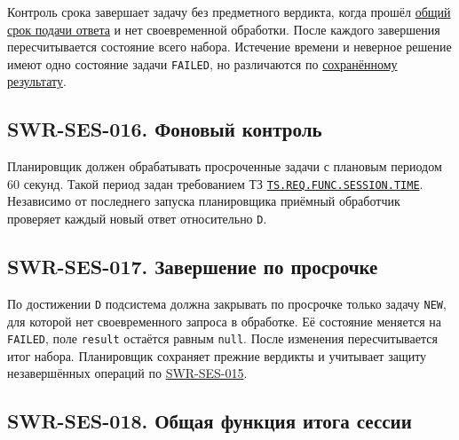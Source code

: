 \documentclass[12pt,a4paper]{article}
\begin{document}
\hypertarget{4-контроль-срока-и-итог}{}

Контроль срока завершает задачу без предметного вердикта, когда прошёл {\hyperlink{время-решения-и-время-обработки}{общий срок подачи ответа}} и нет своевременной обработки. После каждого завершения пересчитывается состояние всего набора. Истечение времени и неверное решение имеют одно состояние задачи \texttt{FAILED}, но различаются по {\hyperlink{чтение-после-потери-ответа}{сохранённому результату}}.

\subsection{SWR-SES-016. Фоновый контроль}\label{swr-ses-016-ux444ux43eux43dux43eux432ux44bux439-ux43aux43eux43dux442ux440ux43eux43bux44c}

\hypertarget{swr-ses-016-фоновый-контроль}{}

\hypertarget{swr-ses-016}{}

Планировщик должен обрабатывать просроченные задачи с плановым периодом 60 секунд. Такой период задан требованием ТЗ {\href{../02\_Техническое\_задание/DOC-02\_Техническое\_задание.pdf\#ts-req-func-session-time}{\texttt{TS.\allowbreak{}REQ.\allowbreak{}FUNC.\allowbreak{}SESSION.\allowbreak{}TIME}}}. Независимо от последнего запуска планировщика приёмный обработчик проверяет каждый новый ответ относительно \texttt{D}.

\subsection{SWR-SES-017. Завершение по просрочке}\label{swr-ses-017-ux437ux430ux432ux435ux440ux448ux435ux43dux438ux435-ux43fux43e-ux43fux440ux43eux441ux440ux43eux447ux43aux435}

\hypertarget{swr-ses-017-завершение-по-просрочке}{}

\hypertarget{swr-ses-017}{}

По достижении \texttt{D} подсистема должна закрывать по просрочке только задачу \texttt{NEW}, для которой нет своевременного запроса в обработке. Её состояние меняется на \texttt{FAILED}, поле \texttt{result} остаётся равным \texttt{null}. После изменения пересчитывается итог набора. Планировщик сохраняет прежние вердикты и учитывает защиту незавершённых операций по {\hyperlink{swr-ses-015}{SWR-SES-015}}.

\subsection{SWR-SES-018. Общая функция итога сессии}\label{swr-ses-018-ux43eux431ux449ux430ux44f-ux444ux443ux43dux43aux446ux438ux44f-ux438ux442ux43eux433ux430-ux441ux435ux441ux441ux438ux438}
\end{document}
